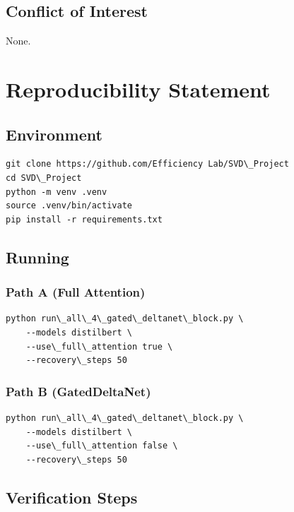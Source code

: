 \subsection{Conflict of Interest}

None.




\section{Reproducibility Statement}

\subsection{Environment}

\begin{lstlisting}
git clone https://github.com/Efficiency Lab/SVD\_Project
cd SVD\_Project
python -m venv .venv
source .venv/bin/activate
pip install -r requirements.txt
\end{lstlisting}

\subsection{Running}

\subsubsection{Path A (Full Attention)}

\begin{lstlisting}
python run\_all\_4\_gated\_deltanet\_block.py \
    --models distilbert \
    --use\_full\_attention true \
    --recovery\_steps 50
\end{lstlisting}

\subsubsection{Path B (GatedDeltaNet)}

\begin{lstlisting}
python run\_all\_4\_gated\_deltanet\_block.py \
    --models distilbert \
    --use\_full\_attention false \
    --recovery\_steps 50
\end{lstlisting}

\subsection{Verification Steps}

